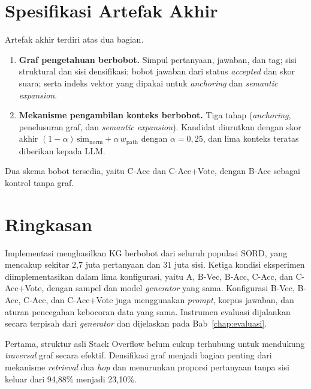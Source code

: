 \section{Spesifikasi Artefak Akhir}
\label{sec:spesifikasi-artefak}

Artefak akhir terdiri atas dua bagian.
\begin{enumerate}
    \item \textbf{Graf pengetahuan berbobot.} Simpul pertanyaan, jawaban, dan tag; sisi struktural dan sisi densifikasi; bobot jawaban dari status \emph{accepted} dan skor suara; serta indeks vektor yang dipakai untuk \emph{anchoring} dan \emph{semantic expansion}.
    \item \textbf{Mekanisme pengambilan konteks berbobot.} Tiga tahap (\emph{anchoring}, penelusuran graf, dan \emph{semantic expansion}). Kandidat diurutkan dengan skor akhir $(1-\alpha)\,\mathrm{sim}_{\mathrm{norm}}+\alpha\,w_{\mathrm{path}}$ dengan $\alpha=0{,}25$, dan lima konteks teratas diberikan kepada LLM.
\end{enumerate}

Dua skema bobot tersedia, yaitu C-Acc dan C-Acc+Vote, dengan B-Acc sebagai kontrol tanpa graf.

\section{Ringkasan}
\label{sec:ringkasan-implementasi}

Implementasi menghasilkan KG berbobot dari seluruh populasi SORD, yang mencakup sekitar 2,7 juta pertanyaan dan 31 juta sisi. Ketiga kondisi eksperimen diimplementasikan dalam lima konfigurasi, yaitu A, B-Vec, B-Acc, C-Acc, dan C-Acc+Vote, dengan sampel dan model \emph{generator} yang sama. Konfigurasi B-Vec, B-Acc, C-Acc, dan C-Acc+Vote juga menggunakan \emph{prompt}, korpus jawaban, dan aturan pencegahan kebocoran data yang sama. Instrumen evaluasi dijalankan secara terpisah dari \emph{generator} dan dijelaskan pada Bab~\ref{chap:evaluasi}.

Pertama, struktur asli Stack Overflow belum cukup terhubung untuk mendukung \emph{traversal} graf secara efektif. Densifikasi graf menjadi bagian penting dari mekanisme \emph{retrieval} dua \emph{hop} dan menurunkan proporsi pertanyaan tanpa sisi keluar dari 94,88\% menjadi 23,10\%.

